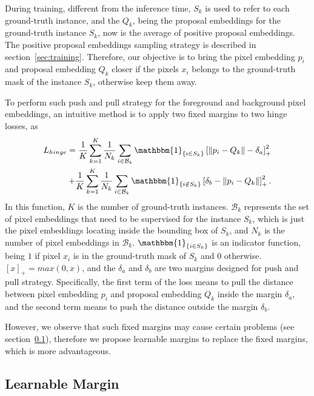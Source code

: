 \documentclass[10pt,twocolumn,letterpaper]{article}
\begin{document}
During training, different from the inference time, $S_k$ is used to refer to each ground-truth instance, and the $Q_k$, being the proposal embeddings for the ground-truth instance $S_k$, now is the average of positive proposal embeddings. 
The positive proposal embeddings sampling strategy is described in section~\ref{sec:training}. 
Therefore, our objective is to bring the pixel embedding $p_i$ and proposal embedding $Q_k$ closer if the pixels $x_i$ belongs to the ground-truth mask of the instance $S_k$, otherwise keep them away. 

To perform such push and pull strategy for the foreground and background pixel embeddings, an intuitive method is to apply two fixed margins to two hinge losses, as 
\begin{equation}
\begin{aligned}
   L_{hinge} = 
   \frac{1}{K}\sum_{k=1}^{K}
   {
      \frac{1}{N_k}\sum_{i\in{\mathcal{B}_k}}
      {
         \mathbbm{1}_{\{i\in S_k\}} \left[\left\|p_i-Q_k\right\|-\delta_a\right]_+^2 
      }
   }\\
   +
   \frac{1}{K}\sum_{k=1}^{K}
   {
      \frac{1}{N_k}\sum_{i\in{\mathcal{B}_k}}
      {
         \mathbbm{1}_{\{i\notin S_k\}} \left[\delta_b-\left\|p_i-Q_k\right\|\right]_+^2.
      }
   }
   \label{eq:hinge_loss}
\end{aligned}
\end{equation}
In this function, $K$ is the number of ground-truth instances.
$\mathcal{B}_k$ represents the set of pixel embeddings that need to be supervised for the instance $S_k$, which is just the pixel embeddings locating inside the bounding box of $S_k$, and $N_k$ is the number of pixel embeddings in $\mathcal{B}_k$. 
$\mathbbm{1}_{\{i\in S_k\}}$ is an indicator function, being $1$ if pixel $x_i$ is in the ground-truth mask of $S_k$ and $0$ otherwise. 
$[x]_+=max(0, x)$, and the $\delta_a$ and $\delta_b$ are two margins designed for push and pull strategy. 
Specifically, the first term of the loss means to pull the distance between pixel embedding $p_i$ and proposal embedding $Q_k$ inside the margin $\delta_a$, and the second term means to push the distance outside the margin $\delta_b$. 


However, we observe that such fixed margins may cause certain problems (see section~\ref{sec:learn_margin}), therefore we propose learnable margins to replace the fixed margins, which is more advantageous.

\subsection{Learnable Margin} \label{sec:learn_margin}
\end{document}
